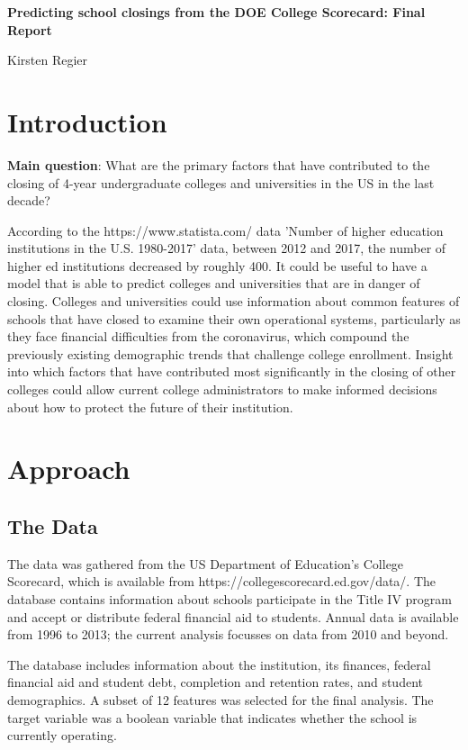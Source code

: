 \documentclass[11pt, letterpaper]{article}
\begin{document}
\begin{center}
\Large{\textbf{Predicting school closings from the DOE College Scorecard: \newline Final Report}}

\large{Kirsten Regier}
\end{center}

\section{Introduction}

\textbf{Main question}: What are the primary factors that have contributed to the closing of 4-year undergraduate colleges and universities in the US in the last decade?

According to the https://www.statista.com/ data 'Number of higher education institutions in the U.S. 1980-2017' data, between 2012 and 2017, the number of higher ed institutions decreased by roughly 400.  It could be useful to have a model that is able to predict colleges and universities that are in danger of closing. 
Colleges and universities could use information about common features of schools that have closed to examine their own operational systems, particularly as they face financial difficulties from the coronavirus, which compound the previously existing demographic trends that challenge college enrollment. Insight into which factors that have contributed most significantly in the closing of other colleges could allow current college administrators to make informed decisions about how to protect the future of their institution.

\section{Approach}
\subsection{The Data}
The data was gathered from the US Department of Education's College Scorecard, which is available from https://collegescorecard.ed.gov/data/. The database contains information about schools participate in the Title IV program and accept or distribute federal financial aid to students. Annual data is available from 1996 to 2013; the current analysis focusses on data from 2010 and beyond.

The database includes information about the institution, its finances, federal financial aid and student debt, completion and retention rates, and student demographics. A subset of 12 features was selected for the final analysis. The target variable was a boolean variable that indicates whether the school is currently operating.
\end{document}
